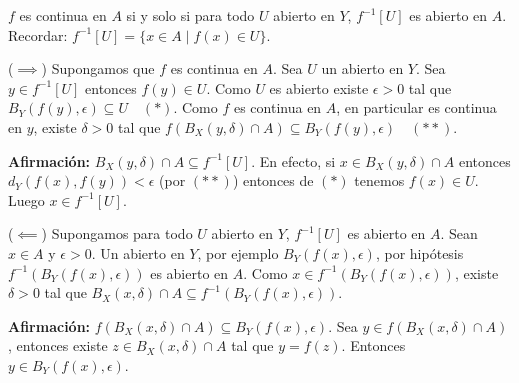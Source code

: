\begin{teorema} %
$f$ es continua en $A$ si y solo si para todo $U$ abierto en $Y$, $f^{-1}[U]$ es abierto en $A$. %
Recordar: $f^{-1}[U] = \{x \in A \mid f(x) \in U\}$. %
\end{teorema}

\begin{dem} %
($\implies$) Supongamos que $f$ es continua en $A$. Sea $U$ un abierto en $Y$. %
Sea $y \in f^{-1}[U]$ entonces $f(y) \in U$. %
Como $U$ es abierto existe $\epsilon > 0$ tal que $B_Y(f(y), \epsilon) \subseteq U \quad (*)$. %
Como $f$ es continua en $A$, en particular es continua en $y$, existe $\delta > 0$ tal que $f(B_X(y, \delta) \cap A) \subseteq B_Y(f(y), \epsilon) \quad (**)$. %

\textbf{Afirmación:} $B_X(y, \delta) \cap A \subseteq f^{-1}[U]$. %
En efecto, si $x \in B_X(y, \delta) \cap A$ entonces $d_Y(f(x), f(y)) < \epsilon$ (por $(**)$) entonces de $(*)$ tenemos $f(x) \in U$. %
Luego $x \in f^{-1}[U]$. %

($\impliedby$) Supongamos para todo $U$ abierto en $Y$, $f^{-1}[U]$ es abierto en $A$. %
Sean $x \in A$ y $\epsilon > 0$. Un abierto en $Y$, por ejemplo $B_Y(f(x), \epsilon)$, por hipótesis $f^{-1}(B_Y(f(x), \epsilon))$ es abierto en $A$. %
Como $x \in f^{-1}(B_Y(f(x), \epsilon))$, existe $\delta > 0$ tal que $B_X(x, \delta) \cap A \subseteq f^{-1}(B_Y(f(x), \epsilon))$. %

\textbf{Afirmación:} $f(B_X(x, \delta) \cap A) \subseteq B_Y(f(x), \epsilon)$. %
Sea $y \in f(B_X(x, \delta) \cap A)$, entonces existe $z \in B_X(x, \delta) \cap A$ tal que $y=f(z)$. %
Entonces $y \in B_Y(f(x), \epsilon)$. %
\end{dem}